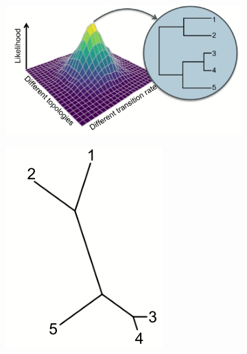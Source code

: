 \documentclass[]{article}
\begin{document}
\begin{figure}[H]
	\caption[Unrooted phylogeny arises because mutation process is reversible]{Unrooted phylogeny arises because mutation process is reversible in our models}\label{fig:unrooted:phylogeny}
	\begin{subfigure}[b]{0.45\textwidth}
		\includegraphics[width=\textwidth]{InferringPastHard1}
	\end{subfigure}
	\begin{subfigure}[b]{0.45\textwidth}
		\includegraphics[width=\textwidth]{InferringPastHard2}
	\end{subfigure}
\end{figure}
\end{document}
